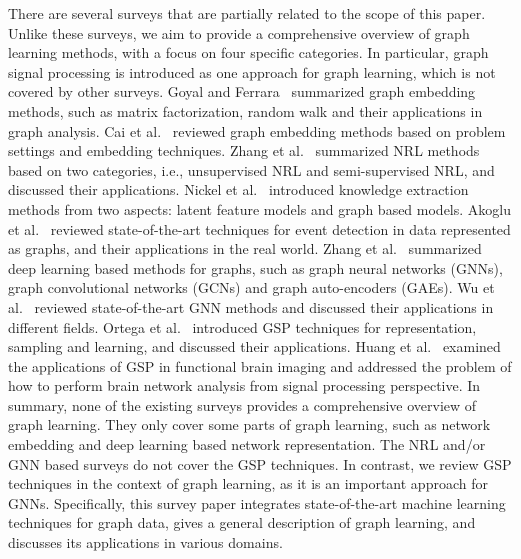 There are several surveys that are partially related to the scope of this paper. Unlike these surveys, we aim to provide a comprehensive overview of graph learning methods, with a focus on four specific categories. In particular, graph signal processing is introduced as one approach for graph learning, which is not covered by other surveys.
Goyal and Ferrara~ summarized graph embedding methods, such as matrix factorization, random walk and their applications in graph analysis. Cai et al.~ reviewed graph embedding methods based on problem settings and embedding techniques. Zhang et al.~ summarized NRL methods based on two categories, i.e., unsupervised NRL and semi-supervised NRL, and discussed their applications. Nickel et al.~ introduced knowledge extraction methods from two aspects: latent feature models and graph based models. Akoglu et al.~ reviewed state-of-the-art techniques for event detection in data represented as graphs, and their applications in the real world. Zhang et al.~ summarized deep learning based methods for graphs, such as graph neural networks (GNNs), graph convolutional networks (GCNs) and graph auto-encoders (GAEs). Wu et al.~ reviewed state-of-the-art GNN methods and discussed their applications in different fields. Ortega et al.~ introduced GSP techniques for representation, sampling and learning, and discussed their applications. Huang et al.~ examined the applications of GSP in functional brain imaging and addressed the problem of how to perform brain network analysis from signal processing perspective.
In summary, none of the existing surveys provides a comprehensive overview of graph learning. They only cover some parts of graph learning, such as network embedding and deep learning based network representation. The NRL and/or GNN based surveys do not cover the GSP techniques. In contrast, we review GSP techniques in the context of graph learning, as it is an important approach for GNNs. Specifically, this survey paper integrates state-of-the-art machine learning techniques for graph data, gives a general description of graph learning, and discusses its applications in various domains.

